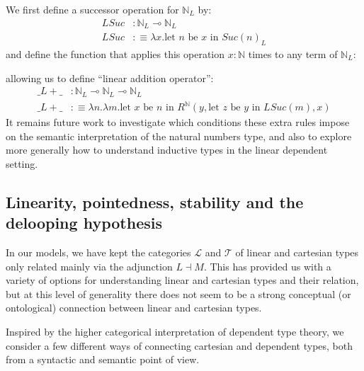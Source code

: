 We first define a successor operation for $\mathbb{N}_L$ by:
\[
  \begin{split}
    LSuc &:\mathbb{N}_L \multimap \mathbb{N}_L\\
    LSuc &:\equiv \lambda x. \text{let $n$ be $x$ in $Suc(n)_L$}
    \end{split}
\]
and define the function that applies this operation $x : \mathbb{N}$ times to any term of $\mathbb{N}_L$:
\begin{prooftree}
\end{prooftree}
allowing us to define ``linear addition operator'':
\[
  \begin{split}
    \_L+\_ &: \mathbb{N}_L \multimap \mathbb{N}_L \multimap \mathbb{N}_L\\
    \_L+\_ &:\equiv \lambda n. \lambda m. \text{let $x$ be $n$ in $R^{\mathbb{N}}(y, \text{let $z$ be $y$ in $LSuc(m)$}, x)$}
  \end{split}
\]
It remains future work to investigate which conditions these extra rules impose on the semantic interpretation of the natural numbers type, and also to explore more generally how to understand inductive types in the linear dependent setting.
  \subsection{Linearity, pointedness, stability and the delooping hypothesis}
  In our models, we have kept the categories $\mathcal{L}$ and $\mathcal{T}$ of linear and cartesian types only related mainly via the adjunction $L \dashv M$. This has provided us with a variety of options for understanding linear and cartesian types and their relation, but at this level of generality there does not seem to be a strong conceptual (or ontological) connection between linear and cartesian types.

  Inspired by the higher categorical interpretation of dependent type theory, we consider a few different ways of connecting cartesian and dependent types, both from a syntactic and semantic point of view.
